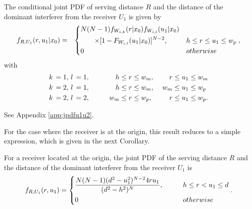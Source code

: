 \documentclass[journal,draftclsnofoot,onecolumn,12pt]{IEEEtran}
\begin{document}
\begin{lemma}\label{lem:jpdfu1u2}
The conditional joint PDF of serving distance $R$ and the distance of the dominant interferer from the receiver $U_1$ is given by
\begin{align}
& f_{R,U_1}(r,u_1 | x_0) = 
&\begin{dcases}
N(N-1)f_{W_{i,k}}(r|x_0)f_{W_{i,l}}(u_1|x_0) \\ 
\qquad \times [1-F_{W_{i,l}}(u_1 | x_0)]^{N-2},  & h \leq r \leq  u_1 \leq w_p \\
0          & otherwise
\end{dcases},
\end{align}
with
\begin{alignat*}{4}\notag
k\, = 1, \, l\, = 1,&& \qquad  h &\leq r \leq w_m,\  &r &\leq  u_1 \leq w_m \\ \notag
k\, = 2, \, l\, = 1,&& \qquad  h &\leq r \leq w_m,\ &w_m &\leq  u_1 \leq w_p \\ \notag
k\, = 2, \, l\, = 2,&& \qquad  w_m &\leq r \leq w_p,\  &r &\leq  u_1 \leq w_p. 
\end{alignat*}
\end{lemma}
\begin{IEEEproof}
See Appendix \ref{app:jpdfu1u2}. 
\end{IEEEproof}
For the case where the receiver is at the origin, this result reduces to a simple expression, which is given in the next Corollary. 
\begin{cor}
For a receiver located at the origin, the joint PDF of the serving distance $R$ and the distance of the dominant interferer from the receiver $U_1$ is 
\begin{align}
f_{R,U_1}(r,u_1) = \begin{dcases}
\frac{N(N-1)(d^2-u_1^2)^{N-2}4ru_1}{(d^2-h^2)^N}, \qquad &h \leq r < u_1 \leq d \\
0 \qquad &otherwise
\end{dcases}.
\end{align}
\end{cor}
\end{document}
